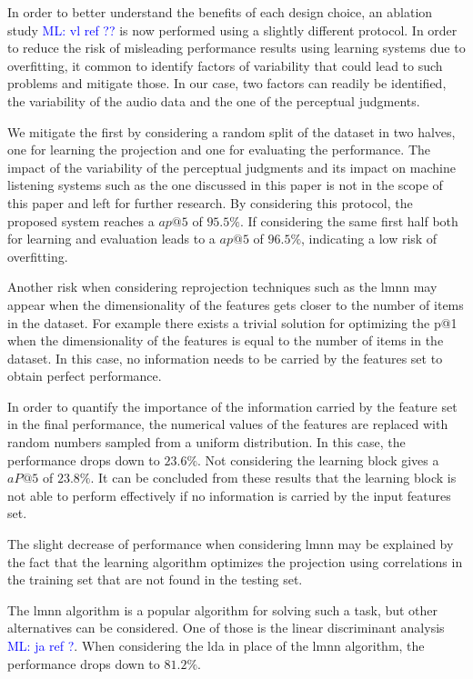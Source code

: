 \documentclass{bmcart}
\newcommand{\ml}[1]{\textcolor{blue}{ML: #1}}
\begin{document}
In order to better understand the benefits of each design choice, an ablation study \ml{vl ref ??} is now performed using a slightly different protocol. In order to reduce the risk of misleading performance results using learning systems due to overfitting, it common to identify factors of variability that could lead to such problems and mitigate those. In our case, two factors can readily be identified, the variability of the audio data and the one of the perceptual judgments.

We mitigate the first by considering a random split of the dataset in two halves, one for learning the projection and one for evaluating the performance. The impact of the variability of the perceptual judgments and its impact on machine listening systems such as the one discussed in this paper is not in the scope of this paper and left for further research. By considering this protocol, the proposed system reaches a $ap@5$ of $95.5\%$. If considering the same first half both for learning and evaluation leads to a $ap@5$ of $96.5\%$, indicating a low risk of overfitting.

Another risk when considering reprojection techniques such as the lmnn may appear when the dimensionality of the features gets closer to the  number of items in the dataset. For example there exists a trivial solution for optimizing the p@1 when the dimensionality of the features is equal to the number of items in the dataset. In this case, no information needs to be carried by the features set to obtain perfect performance.

In order to quantify the importance of the information carried by the feature set in the final performance, the numerical values of the features are replaced with random numbers sampled from a uniform distribution. In this case, the performance drops down to $23.6\%$. Not considering the learning block gives a $aP@5$ of $23.8\%$. It can be concluded from these results that the learning block is not able to perform effectively if no information is carried by the input features set.

The slight decrease of performance when considering lmnn may be explained by the fact that the learning algorithm optimizes the projection using correlations in the training set that are not found in the testing set.

The lmnn algorithm is a popular algorithm for solving such a task, but other alternatives can be considered. One of those is the linear discriminant analysis \ml{ja ref ?}\cite{}. When considering the lda in place of the lmnn algorithm, the performance drops down to $81.2\%$.
\end{document}
